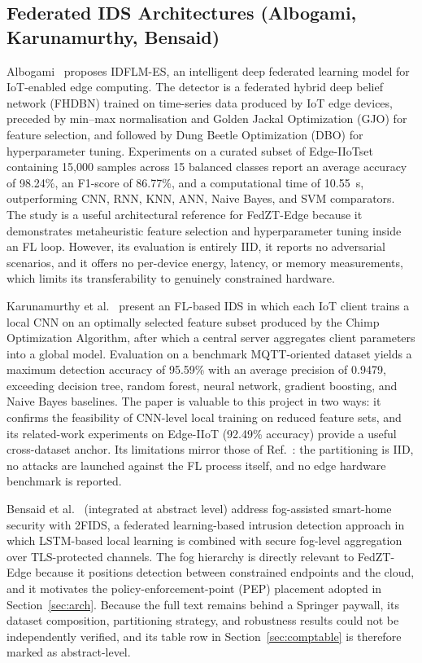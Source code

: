 \documentclass[11pt,a4paper]{article}
\begin{document}
\subsection{Federated IDS Architectures (Albogami, Karunamurthy, Bensaid)}
\label{sec:flids}

Albogami~\cite{albogami2025} proposes IDFLM-ES, an intelligent deep
federated learning model for IoT-enabled edge computing. The detector is a
federated hybrid deep belief network (FHDBN) trained on time-series data
produced by IoT edge devices, preceded by min--max normalisation and
Golden Jackal Optimization (GJO) for feature selection, and followed by
Dung Beetle Optimization (DBO) for hyperparameter tuning. Experiments on a
curated subset of Edge-IIoTset containing 15{,}000 samples across 15
balanced classes report an average accuracy of 98.24\%, an F1-score of
86.77\%, and a computational time of 10.55~s, outperforming CNN, RNN, KNN,
ANN, Naive Bayes, and SVM comparators. The study is a useful architectural
reference for FedZT-Edge because it demonstrates metaheuristic feature
selection and hyperparameter tuning inside an FL loop. However, its
evaluation is entirely IID, it reports no adversarial scenarios, and it
offers no per-device energy, latency, or memory measurements, which limits
its transferability to genuinely constrained hardware.

Karunamurthy et al.~\cite{karunamurthy2025} present an FL-based IDS in
which each IoT client trains a local CNN on an optimally selected feature
subset produced by the Chimp Optimization Algorithm, after which a central
server aggregates client parameters into a global model. Evaluation on a
benchmark MQTT-oriented dataset yields a maximum detection accuracy of
95.59\% with an average precision of 0.9479, exceeding decision tree,
random forest, neural network, gradient boosting, and Naive Bayes
baselines. The paper is valuable to this project in two ways: it confirms
the feasibility of CNN-level local training on reduced feature sets, and
its related-work experiments on Edge-IIoT (92.49\% accuracy) provide a
useful cross-dataset anchor. Its limitations mirror those of
Ref.~\cite{albogami2025}: the partitioning is IID, no attacks are launched
against the FL process itself, and no edge hardware benchmark is reported.

Bensaid et al.~\cite{bensaid2025} (integrated at abstract level) address
fog-assisted smart-home security with 2FIDS, a federated learning-based
intrusion detection approach in which LSTM-based local learning is
combined with secure fog-level aggregation over TLS-protected channels.
The fog hierarchy is directly relevant to FedZT-Edge because it positions
detection between constrained endpoints and the cloud, and it motivates the
policy-enforcement-point (PEP) placement adopted in
Section~\ref{sec:arch}. Because the full text remains behind a Springer
paywall, its dataset composition, partitioning strategy, and robustness
results could not be independently verified, and its table row in
Section~\ref{sec:comptable} is therefore marked as abstract-level.
\end{document}
